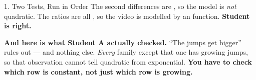 \documentclass[10pt]{article}
\begin{document}
\begin{notesbox}{1. Two Tests, Run in Order}
\vspace{6pt}
The second differences are \blank{3.0cm}, so the model is \emph{not} quadratic. The ratios are all
\blank{1.2cm}, so the video is modelled by an \blank{2.6cm} function. \textbf{Student
\blank{0.8cm} is right.}

\vspace{4pt}
\textbf{And here is what Student A actually checked.} ``The jumps get bigger'' rules out
\blank{2.0cm} --- and nothing else. \emph{Every} family except that one has growing jumps, so that
observation cannot tell quadratic from exponential. \textbf{You have to check which row is
constant, not just which row is growing.}
\end{notesbox}

\vspace{0.10in}
\end{document}
